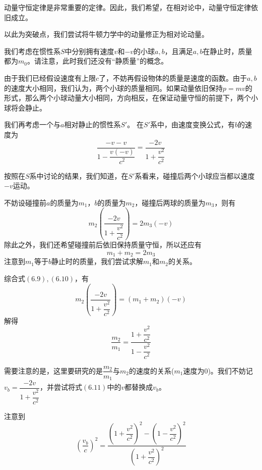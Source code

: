 \begin{prove}[$p=\gamma mv$]
	动量守恒定律是非常重要的定律。因此，我们希望，在相对论中，动量守恒定律依旧成立。
	
	以此为突破点，我们尝试将牛顿力学中的动量修正为相对论动量。
	
	我们考虑在惯性系$S$中分别拥有速度$v$和$-v$的小球$a,b$，且满足$a,b$在静止时，质量都为$m_0$。请注意，此时我们还没有``静质量''的概念。
	
	由于我们已经假设速度有上限$c$了，不妨再假设物体的质量是速度的函数。由于$a,b$的速度大小相同，我们认为，两个小球的质量相同。如果动量依旧保持$p=mv$的形式，那么两个小球动量大小相同，方向相反，在保证动量守恒的前提下，两个小球将会静止。
	
	我们再考虑一个与$a$相对静止的惯性系$S'$。
	在$S'$系中，由速度变换公式，有$b$的速度为
	\[\dfrac{-v-v}{1-\dfrac{v(-v)}{c^2}}=\dfrac{-2v}{1+\dfrac{v^2}{c^2}}\]
	
	按照在$S$系中讨论的结果，我们知道，在$S'$系看来，碰撞后两个小球应当都以速度$-v$运动。
	
	不妨设碰撞前$a$的质量为$m_1$，$b$的质量为$m_2$，碰撞后两球的质量为$m_3$，则有
	\begin{equation}
		m_2\left(\dfrac{-2v}{1+\dfrac{v^2}{c^2}}\right)=2m_3(-v)
	\end{equation}
	除此之外，我们还希望碰撞前后依旧保持质量守恒，所以还应有
	\begin{equation}
		m_1+m_2=2m_3
	\end{equation}
	注意到$m_1$等于$b$静止时的质量，我们尝试求解$m_1$和$m_2$的关系。
	
	综合式$(6.9),(6.10)$，有
	\[m_2\left(\dfrac{-2v}{1+\dfrac{v^2}{c^2}}\right)=(m_1+m_2)(-v)\]
	解得
	\begin{equation}
		\dfrac{m_2}{m_1}=\dfrac{1+\dfrac{v^2}{c^2}}{1-\dfrac{v^2}{c^2}}
	\end{equation}
	
	需要注意的是，这里要研究的是$\dfrac{m_2}{m_1}$与$m_2$的速度的关系($m_1$速度为$0$)。我们不妨记$v_b=\dfrac{-2v}{1+\dfrac{v^2}{c^2}}$，并尝试将式$(6.11)$中的$v$都替换成$v_b$。
	
	注意到
	\[\left(\dfrac{v_b}{c}\right)^2=\dfrac{\left(1+\dfrac{v^2}{c^2}\right)^2-\left(1-\dfrac{v^2}{c^2}\right)^2}{\left(1+\dfrac{v^2}{c^2}\right)^2}\]
	

\end{prove}
